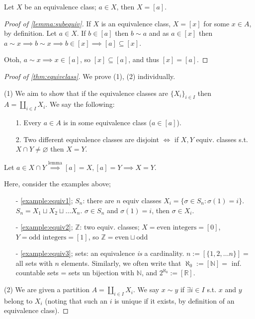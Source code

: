 \documentclass[12pt,oneside]{article}
\begin{document}
\begin{lemma}\label{lemma:subequiv}
  Let $X$ be an equivalence class; $a \in X$, then $X = [a]$.
\end{lemma}
\begin{proof}[Proof of \cref{lemma:subequiv}]
  If $X$ is an equivalence class, $X = [x]$ for some $x \in A$, by definition. Let $a \in X$. If $b \in [a]$ then $b \sim a$ and as $a \in [x]$ then $a \sim x \implies b \sim x \implies b \in [x] \implies [a] \subseteq [x]$.

  Otoh, $a \sim x \implies x \in [a]$, so $[x] \subseteq [a]$, and thus $[x] = [a]$.
\end{proof}

\begin{proof}[Proof of \cref{thm:equivclass}]
  We prove (1), (2) individually.

 (1) We aim to show that if the equivalence classes are $\{X_i\}_{i \in I}$ then $A = \amalg_{i \in I} X_i$. We say the following:
 \begin{itemize}
  \item[1.] Every $a \in A$ is in some equivalence class ($a \in [a]$).
  \item[2.] Two different equivalence classes are disjoint $\iff$ if $X,Y$ equiv. classes s.t. $X \cap Y \ne \varnothing$ then $X = Y$.\footnotemark
 \end{itemize}

 Let $a \in X \cap Y \overset{\text{lemma}}{\implies} [a] = X, [a] = Y \implies X = Y$.

 Here, consider the examples above;
 \begin{itemize}
  \item[-]\cref{example:equiv1}; $S_n$: there are $n$ equiv classes $X_i = \{\sigma \in S_n : \sigma(1) = i\}$. $S_n = X_1 \sqcup X_2 \sqcup \dots X_n$. $\sigma \in S_n$ and $\sigma(1) = i$, then $\sigma \in X_i$.
  \item[-] \cref{example:equiv2}; $\mathbb{Z}$: two equiv. classes; $X = \text{even integers} = [0]$, $Y = \text{odd integers} = [1]$, so $\mathbb{Z} = \text{even} \sqcup \text{odd}$
  \item[-] \cref{example:equiv3}; sets: an equivalence \textit{is} a cardinality. $n:=[\{1,2, \dots n\}] = $ all sets with $n$ elements. Similarly, we often write that $\aleph_0 := [\mathbb{N}] =$ inf. countable sets = sets un bijection with $\mathbb{N}$, and $2^{\aleph_0} := [\mathbb{R}]$.
 \end{itemize}

 (2) We are given a partition $A = \amalg_{i \in I} X_i$. We say $x \sim y$ if $\exists i \in I$ s.t. $x$ and $y$ belong to $X_i$ (noting that such an $i$ is unique if it exists, by definition of an equivalence class).


\end{proof}
\end{document}
